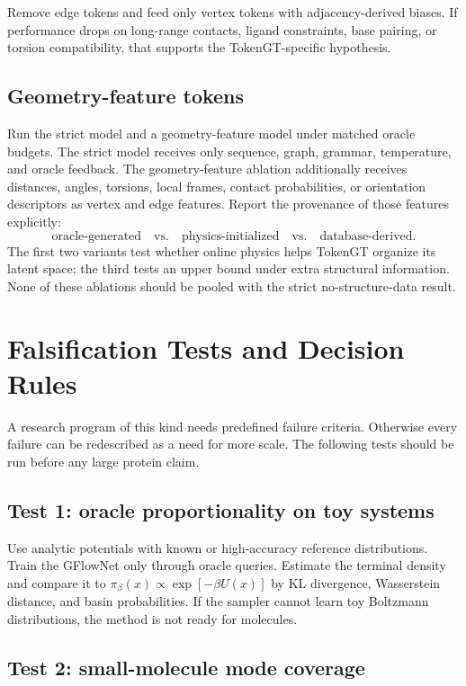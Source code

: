 \documentclass[11pt]{article}
\begin{document}
Remove edge tokens and feed only vertex tokens with adjacency-derived biases. If performance drops on long-range contacts, ligand constraints, base pairing, or torsion compatibility, that supports the TokenGT-specific hypothesis.

\subsection{Geometry-feature tokens}

Run the strict model and a geometry-feature model under matched oracle budgets. The strict model receives only sequence, graph, grammar, temperature, and oracle feedback. The geometry-feature ablation additionally receives distances, angles, torsions, local frames, contact probabilities, or orientation descriptors as vertex and edge features. Report the provenance of those features explicitly:
\[
\text{oracle-generated}
\quad\text{vs.}\quad
\text{physics-initialized}
\quad\text{vs.}\quad
\text{database-derived}.
\]
The first two variants test whether online physics helps TokenGT organize its latent space; the third tests an upper bound under extra structural information. None of these ablations should be pooled with the strict no-structure-data result.

\section{Falsification Tests and Decision Rules}

A research program of this kind needs predefined failure criteria. Otherwise every failure can be redescribed as a need for more scale. The following tests should be run before any large protein claim.

\subsection{Test 1: oracle proportionality on toy systems}

Use analytic potentials with known or high-accuracy reference distributions. Train the GFlowNet only through oracle queries. Estimate the terminal density and compare it to $\pi_\beta(x)\propto\exp[-\beta U(x)]$ by KL divergence, Wasserstein distance, and basin probabilities. If the sampler cannot learn toy Boltzmann distributions, the method is not ready for molecules.

\subsection{Test 2: small-molecule mode coverage}
\end{document}
